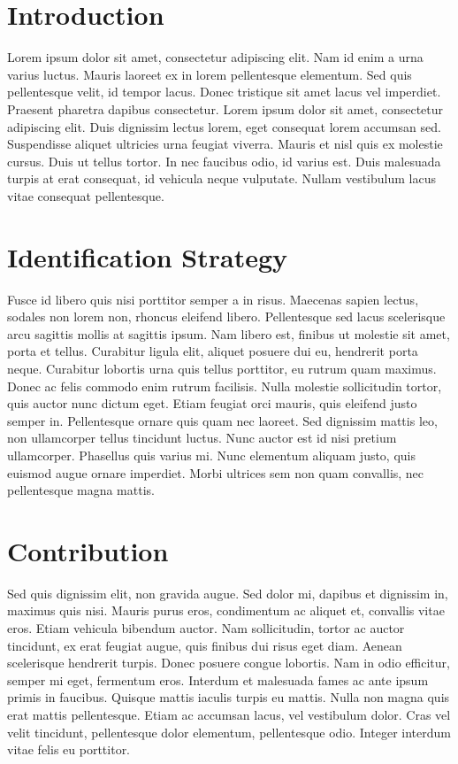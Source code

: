 \documentclass[11.5pt, twoside]{article}         %
\newcommand{\printbibliography}[1]{}
\begin{document}

\tsection

\section{Introduction}
Lorem ipsum dolor sit amet, consectetur adipiscing elit. Nam id enim a urna varius luctus. Mauris laoreet ex in lorem pellentesque elementum. Sed quis pellentesque velit, id tempor lacus. Donec tristique sit amet lacus vel imperdiet. Praesent pharetra dapibus consectetur. Lorem ipsum dolor sit amet, consectetur adipiscing elit. Duis dignissim lectus lorem, eget consequat lorem accumsan sed. Suspendisse aliquet ultricies urna feugiat viverra. Mauris et nisl quis ex molestie cursus. Duis ut tellus tortor. In nec faucibus odio, id varius est. Duis malesuada turpis at erat consequat, id vehicula neque vulputate. Nullam vestibulum lacus vitae consequat pellentesque.

\section{Identification Strategy}
Fusce id libero quis nisi porttitor semper a in risus. Maecenas sapien lectus, sodales non lorem non, rhoncus eleifend libero. Pellentesque sed lacus scelerisque arcu sagittis mollis at sagittis ipsum. Nam libero est, finibus ut molestie sit amet, porta et tellus. Curabitur ligula elit, aliquet posuere dui eu, hendrerit porta neque. Curabitur lobortis urna quis tellus porttitor, eu rutrum quam maximus. Donec ac felis commodo enim rutrum facilisis. Nulla molestie sollicitudin tortor, quis auctor nunc dictum eget. Etiam feugiat orci mauris, quis eleifend justo semper in. Pellentesque ornare quis quam nec laoreet. Sed dignissim mattis leo, non ullamcorper tellus tincidunt luctus. Nunc auctor est id nisi pretium ullamcorper. Phasellus quis varius mi. Nunc elementum aliquam justo, quis euismod augue ornare imperdiet. Morbi ultrices sem non quam convallis, nec pellentesque magna mattis.

\section{Contribution}
Sed quis dignissim elit, non gravida augue. Sed dolor mi, dapibus et dignissim in, maximus quis nisi. Mauris purus eros, condimentum ac aliquet et, convallis vitae eros. Etiam vehicula bibendum auctor. Nam sollicitudin, tortor ac auctor tincidunt, ex erat feugiat augue, quis finibus dui risus eget diam. Aenean scelerisque hendrerit turpis. Donec posuere congue lobortis. Nam in odio efficitur, semper mi eget, fermentum eros. Interdum et malesuada fames ac ante ipsum primis in faucibus. Quisque mattis iaculis turpis eu mattis. Nulla non magna quis erat mattis pellentesque. Etiam ac accumsan lacus, vel vestibulum dolor. Cras vel velit tincidunt, pellentesque dolor elementum, pellentesque odio. Integer interdum vitae felis eu porttitor.

\end{document}
